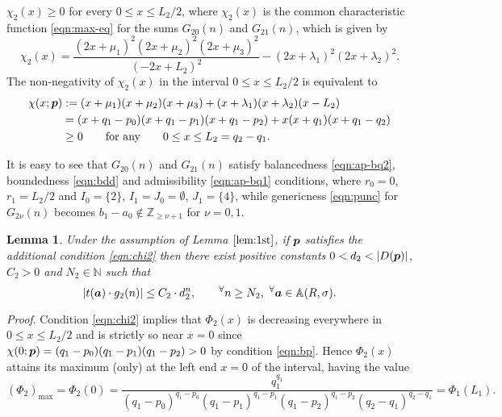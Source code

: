 \documentclass[a4paper,12pt]{article}
\theoremstyle{plain}
\newtheorem{lemma}[theorem]{Lemma}
\def\A{\mathbb{A}}
\def\N{\mathbb{N}}
\def\Z{\mathbb{Z}}
\def\ba{\mbox{\boldmath $a$}}
\def\bp{\mbox{\boldmath $p$}}
\begin{document}
$\chi_2(x) \ge 0$ for every $0 \le x \le L_2/2$, where $\chi_2(x)$ is 
the common characteristic function \eqref{eqn:max-eq} for the 
sums $G_{20}(n)$ and $G_{21}(n)$, which is given by 
\[
\chi_2(x) = 
\frac{(2 x + \mu_1)^2(2 x + \mu_2)^2 (2 x + \mu_3)^2}{(-2 x + L_2)^2} -
(2 x + \lambda_1)^2 (2 x +\lambda_2)^2.   
\]
The non-negativity of $\chi_2(x)$ in the interval $0 \le x \le L_2/2$ 
is equivalent to   
\begin{equation} \label{eqn:chi2} 
\begin{split}
\chi(x; \bp)  
&:= (x + \mu_1)(x + \mu_2) (x + \mu_3) + 
(x + \lambda_1) (x +\lambda_2) (x -L_2)  \\
&= (x+q_1-p_0)(x+q_1-p_1)(x+q_1-p_2)+ x (x+q_1) (x+q_1-q_2) \\ 
&\ge 0 \qquad \mbox{for any} \qquad 0 \le x \le L_2 = q_2 - q_1.  
\end{split}
\end{equation}
\par
It is easy to see that $G_{20}(n)$ and $G_{21}(n)$ satisfy balancedness 
\eqref{eqn:ap-bq2}, boundedness \eqref{eqn:bdd} and admissibility 
\eqref{eqn:ap-bq1} conditions, where $r_0 = 0$, $r_1 = L_2/2$ and 
$I_0 = \{2\}$, $I_1 = J_0 = \emptyset$, $J_1 = \{4\}$, while 
genericness \eqref{eqn:punc} for $G_{2\nu}(n)$ becomes  
$b_1-a_0 \not\in \Z_{\ge \nu+1}$ for $\nu = 0, 1$.  
\begin{lemma} \label{lem:2nd} 
Under the assumption of Lemma $\ref{lem:1st}$, if $\bp$ satisfies the 
additional condition \eqref{eqn:chi2} then there exist positive constants  
$0 < d_2 < |D(\bp)|$, $C_2 > 0$ and $N_2 \in \N$ such that 
\[
|t(\ba) \cdot g_2(n)| \le C_2 \cdot d_2^n,  
\qquad {}^{\forall} n \ge N_2, \, \, {}^{\forall}\ba \in \A(R, \sigma).   
\]
\end{lemma} 
{\it Proof}. 
Condition \eqref{eqn:chi2} implies that $\Phi_2(x)$ is decreasing 
everywhere in $0 \le x \le L_2/2$ and is strictly so near 
$x = 0$ since $\chi(0; \bp) = (q_1-p_0)(q_1-p_1)(q_1-p_2) > 0$ by 
condition \eqref{eqn:bp}.  
Hence $\Phi_2(x)$ attains its maximum (only) at the left end 
$x = 0$ of the interval, having the value  
\[
(\Phi_2)_{\mathrm{max}} 
= \Phi_2(0) = \frac{q_1^{q_1}}{(q_1-p_0)^{q_1-p_0} (q_1-p_1)^{q_1-p_1}
(q_1-p_2)^{q_1-p_2}(q_2-q_1)^{q_2-q_1}}  
= \Phi_1(L_1).  
\]
\end{document}
